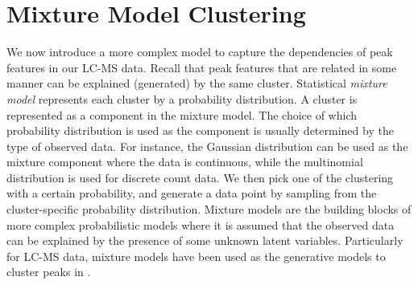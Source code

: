\section{Mixture Model Clustering}

We now introduce a more complex model to capture the dependencies of peak features in our LC-MS data. Recall that peak features that are related in some manner can be explained (generated) by the same cluster. Statistical \emph{mixture model} represents each cluster by a probability distribution. A cluster is represented as a component in the mixture model. The choice of which probability distribution is used as the component is usually determined by the type of observed data. For instance, the Gaussian distribution can be used as the mixture component where the data is continuous, while the multinomial distribution is used for discrete count data. We then pick one of the clustering with a certain probability, and generate a data point by sampling from the cluster-specific probability distribution. Mixture models are the building blocks of more complex probabilistic models where it is assumed that the observed data can be explained by the presence of some unknown latent variables. Particularly for LC-MS data, mixture models have been used as the generative models to cluster peaks in \cite{Rogers2012,Daly2014}.

